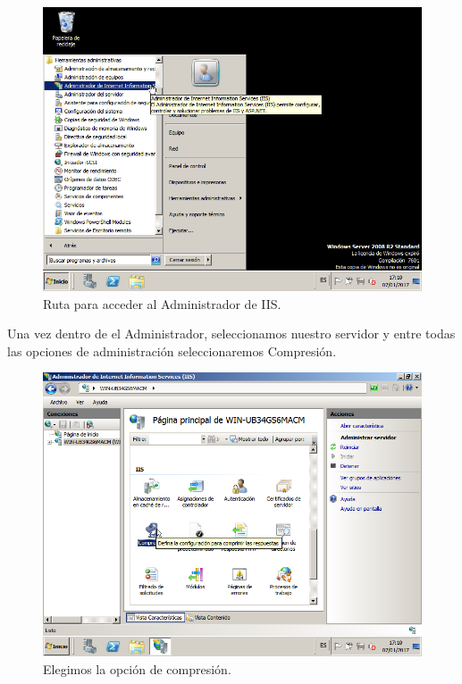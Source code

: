 \begin{figure}[H] %
	\centering
	\includegraphics[scale=0.5]{imagenes/Admin_IIS.png}  %
	\caption{Ruta para acceder al Administrador de IIS.} \label{fig:figura13}
\end{figure}

Una vez dentro de el Administrador, seleccionamos nuestro servidor y entre todas las opciones de administración seleccionaremos Compresión.

\begin{figure}[H] %
	\centering
	\includegraphics[scale=0.5]{imagenes/Compresion.png}  %
	\caption{Elegimos la opción de compresión.} \label{fig:figura14}
\end{figure}

